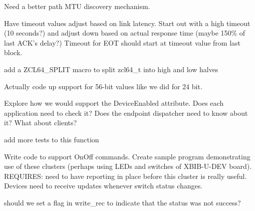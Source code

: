 \begin{DoxyRefList}
\item[\label{todo__todo000004}%
\hypertarget{todo__todo000004}{}%
File \hyperlink{xbee__sxa__socket_8c}{xbee\-\_\-sxa\-\_\-socket.c} ]Need a better path M\-T\-U discovery mechanism. 
\item[\label{todo__todo000013}%
\hypertarget{todo__todo000013}{}%
File \hyperlink{xbee__xmodem_8c}{xbee\-\_\-xmodem.c} ]Have timeout values adjust based on link latency. Start out with a high timeout (10 seconds?) and adjust down based on actual response time (maybe 150\% of last A\-C\-K's delay?) Timeout for E\-O\-T should start at timeout value from last block.  
\item[\label{todo__todo000032}%
\hypertarget{todo__todo000032}{}%
File \hyperlink{zcl64_8h}{zcl64.h} ]add a Z\-C\-L64\-\_\-\-S\-P\-L\-I\-T macro to split zcl64\-\_\-t into high and low halves  
\item[\label{todo__todo000033}%
\hypertarget{todo__todo000033}{}%
Global \hyperlink{group__zcl__64_ga2e906cb47fc172ae60da5178075dd3c7}{zcl64\-\_\-t} ]Actually code up support for 56-\/bit values like we did for 24 bit.  
\item[\label{todo__todo000034}%
\hypertarget{todo__todo000034}{}%
File \hyperlink{zcl__basic_8h}{zcl\-\_\-basic.h} ]Explore how we would support the Device\-Enabled attribute. Does each application need to check it? Does the endpoint dispatcher need to know about it? What about clients?  
\item[\label{todo__todo000017}%
\hypertarget{todo__todo000017}{}%
Global \hyperlink{group__zcl__commissioning_ga91a578cd65163c738bd57a4249955c05}{zcl\-\_\-comm\-\_\-sas\-\_\-is\-\_\-valid} (const \hyperlink{structzcl__comm__state__t}{zcl\-\_\-comm\-\_\-state\-\_\-t} F\-A\-R $\ast$comm)]add more tests to this function  
\item[\label{todo__todo000035}%
\hypertarget{todo__todo000035}{}%
File \hyperlink{zcl__onoff_8h}{zcl\-\_\-onoff.h} ]Write code to support On\-Off commands. Create sample program demonstrating use of these clusters (perhaps using L\-E\-Ds and switches of X\-B\-I\-B-\/\-U-\/\-D\-E\-V board). R\-E\-Q\-U\-I\-R\-E\-S\-: need to have reporting in place before this cluster is really useful. Devices need to receive updates whenever switch status changes.  
\item[\label{todo__todo000021}%
\hypertarget{todo__todo000021}{}%
Global \hyperlink{group__zcl_ga9f9ac99001185554fe24dc7b09c0b0b0}{zcl\-\_\-parse\-\_\-attribute\-\_\-record} (const \hyperlink{structzcl__attribute__base__t}{zcl\-\_\-attribute\-\_\-base\-\_\-t} F\-A\-R $\ast$entry, \hyperlink{structzcl__attribute__write__rec__t}{zcl\-\_\-attribute\-\_\-write\-\_\-rec\-\_\-t} $\ast$write\-\_\-rec)]should we set a flag in write\-\_\-rec to indicate that the status was not success?  

\end{DoxyRefList}
